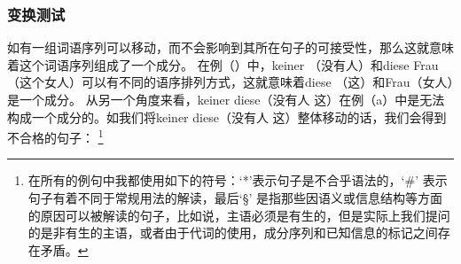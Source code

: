 \subsubsection{变换测试}
如有一组词语序列可以移动，而不会影响到其所在句子的可接受性，那么这就意味着这个词语序列组成了一个成分。
在例（）中，keiner （没有人）和diese Frau （这个女人）可以有不同的语序排列方式，这就意味着diese （这）和Frau（女人）是一个成分。
\eal
{}
\zl
从另一个角度来看，keiner diese（没有人 这）在例（a）中是无法构成一个成分的。如我们将keiner diese（没有人 这）整体移动的话，我们会得到不合格的句子：
\footnote{%
在所有的例句中我都使用如下的符号：`*'\is{*}\isc{*}表示句子是不合乎语法的，`\#'\is{\#}\isc{\#} 表示句子有着不同于常规用法的解读，最后`\S'\is{\S}\isc{\S} 是指那些因语义或信息结构等方面的原因可以被解读的句子，比如说，主语必须是有生的，但是实际上我们提问的是非有生的主语，或者由于代词的使用，成分序列和已知信息的标记之间存在矛盾。 }
 \eal
{}
\zl

